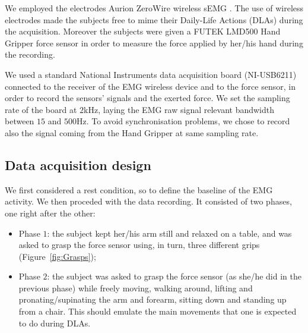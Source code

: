 We employed the electrodes  Aurion ZeroWire wireless sEMG 
\cite{zerowire}. The use of wireless electrodes made the subjects free to mime their Daily-Life Actions (DLAs) during the acquisition.
Moreover the subjects were given a FUTEK LMD500 Hand Gripper force sensor \cite{LMD500} in order to measure the force applied by her/his hand during the recording.


We used a standard National Instruments data acquisition board (NI-USB6211) connected to the receiver of the EMG wireless device and to the force sensor, in order to record the 
sensors' signals and the exerted force. We set the sampling rate of the board at $2$kHz, laying the EMG raw signal relevant bandwidth between $15$ and $500$Hz. To avoid synchronisation problems, we chose to record also the signal coming from the Hand Gripper at same sampling rate.


\subsection{Data acquisition design}

We first considered a rest condition, so to define the baseline of the EMG activity. We then proceded with the data recording.
It consisted of two phases, one right after the other:

\begin{itemize}
	\item Phase $1$: the subject kept her/his arm still and relaxed on a table, and was asked to grasp the force sensor using, in turn, three different grips (Figure~\ref{fig:Grasps});
	\item Phase $2$: the subject was asked to grasp the force sensor (as she/he did in the previous phase) while freely moving, walking around, lifting and pronating/supinating 
the arm and forearm, sitting down and standing up from a chair. This should emulate the main movements that one is expected to do during  DLAs.
\end{itemize}

